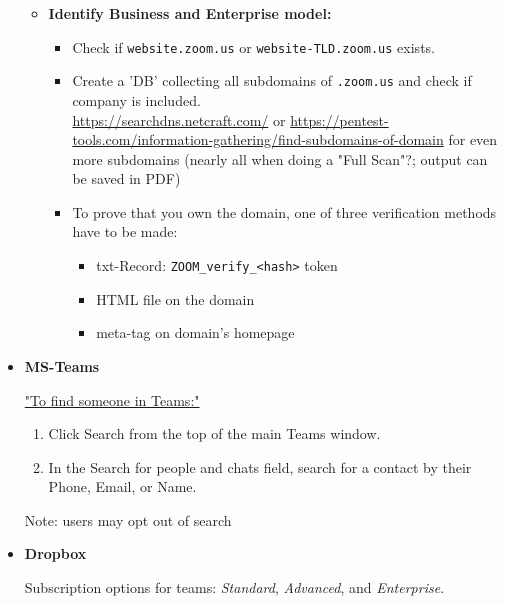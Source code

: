 \documentclass[12pt]{article}
\begin{document}
\begin{itemize}
    \begin{itemize}
        \item \textbf{Identify Business and Enterprise model:} 
        \begin{itemize}
            \item Check if \verb|website.zoom.us| or \verb|website-TLD.zoom.us| exists.
            \item Create a 'DB' collecting all subdomains of \verb|.zoom.us| and check if company is included.\\
            \url{https://searchdns.netcraft.com/} or \url{https://pentest-tools.com/information-gathering/find-subdomains-of-domain} for even more subdomains (nearly all when doing a "Full Scan"?; output can be saved in PDF)
            \item To prove that you own the domain, one of three verification methods have to be made:
            \begin{itemize}
                \item txt-Record: \verb|ZOOM_verify_<hash>| token
                \item HTML file on the domain
                \item meta-tag on domain's homepage
            \end{itemize}
        \end{itemize}
    \end{itemize}
    
    
    \item \textbf{MS-Teams}
    
    
    \href{https://support.microsoft.com/en-us/office/find-your-friends-and-family-in-teams-711bfcef-9e40-49d5-8df7-ee071a048c91#ID0EACAAA=Desktop}{"To find someone in Teams:"}
    \begin{enumerate}
        \item Click Search from the top of the main Teams window.
        \item In the Search for people and chats field, search for a contact by their Phone, Email, or Name.
    \end{enumerate}
    Note: users may opt out of search
    
    
    \item \textbf{Dropbox}
    
    Subscription options for teams: \textit{Standard}, \textit{Advanced}, and \textit{Enterprise}.
    

\end{itemize}
\end{document}
